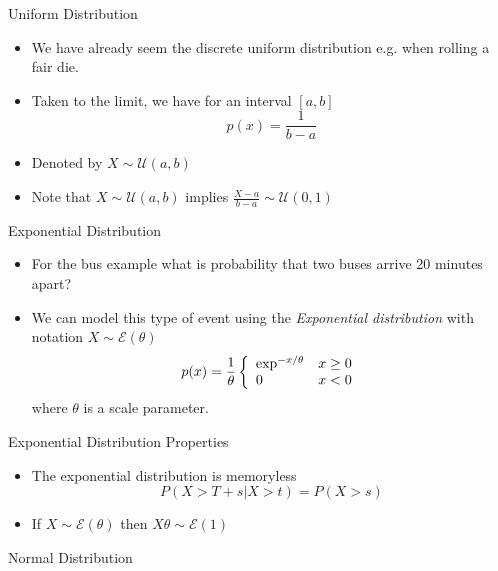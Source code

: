 \begin{frame}{Uniform Distribution}  
 \begin{itemize} 
  \item We have already seem the discrete uniform distribution e.g. when rolling a fair die. 
\item Taken to the limit, we have for an interval $[a, b]$ 
\begin{displaymath} 
 p(x) = \frac{1}{b-a}
\end{displaymath}
\item Denoted by $X \sim \mathcal{U}(a, b)$
\item Note that  $X \sim \mathcal{U}(a, b)$ implies $\frac{X - a}{b - a} \sim \mathcal{U}(0, 1)$
\end{itemize}
\end{frame}

\begin{frame}{Exponential Distribution} 
\begin{itemize} 
 \item For the bus example what is probability that two buses arrive 20 minutes apart? 
 \item We can model this type of event using the \emph{Exponential distribution} with notation $X \sim \mathcal{E}(\theta)$
 \begin{displaymath}
  p(x) = \frac{1}{\theta} \left\{ \begin{array}{l l} \exp^{-x/\theta} & x \geq 0 \\ 0 & x < 0 \end{array} \right. 
 \end{displaymath}
  where $\theta$ is a scale parameter. 
\end{itemize}
\end{frame}

\begin{frame}{Exponential Distribution Properties}
\begin{itemize} 
 \item The exponential distribution is memoryless 
 \begin{displaymath}
  P(X > T + s | X > t) = P(X > s)
 \end{displaymath}
\item If $X \sim \mathcal{E}(\theta)$ then $X\theta \sim \mathcal{E}(1)$
\end{itemize}
\end{frame}

\begin{frame}{Normal Distribution}  
 
\end{frame}